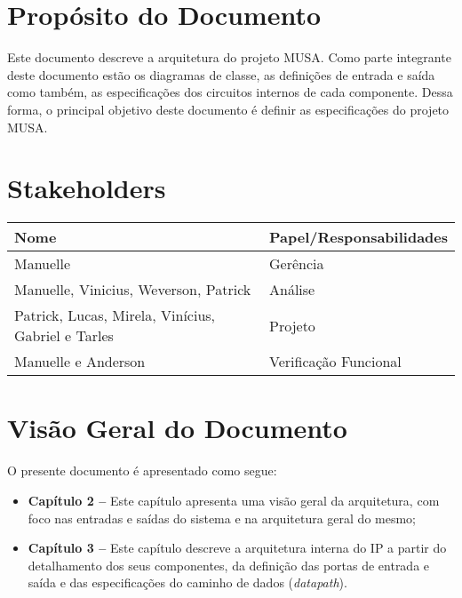   \section{Propósito do Documento}
  Este documento descreve a arquitetura do projeto MUSA. Como parte integrante deste documento estão os diagramas de classe, as definições de entrada e saída como também, as especificações dos circuitos internos de cada componente. Dessa forma, o principal objetivo deste documento é definir as especificações do projeto MUSA.

  \section{Stakeholders}
    \FloatBarrier
    \begin{table}[H] 
      \begin{center}
        \begin{tabular}[pos]{|m{6cm} | m{8cm}|} 
          \hline 
          \cellcolor[gray]{0.9}\textbf{Nome} & \cellcolor[gray]{0.9}\textbf{Papel/Responsabilidades} \\  
           \hline Manuelle 	& Gerência \\
           \hline Manuelle, Vinicius, Weverson, Patrick 	& Análise \\
           \hline Patrick, Lucas, Mirela, Vinícius, Gabriel e Tarles 	& Projeto \\ \hline
           \hline Manuelle e Anderson	& Verificação Funcional \\ \hline
        \end{tabular}
      \end{center}
    \end{table} 

\section{Visão Geral do Documento}

O presente documento é apresentado como segue:

  \begin{itemize}
   \item \textbf{Capítulo 2 --} Este capítulo apresenta uma visão geral da arquitetura, com foco nas entradas e saídas do sistema e na arquitetura geral do mesmo;
   \item \textbf{Capítulo 3 --} Este capítulo descreve a arquitetura interna do IP a partir do detalhamento dos seus componentes, da definição das portas de entrada e saída e das especificações do caminho de dados (\textit{datapath}).
  \end{itemize}

